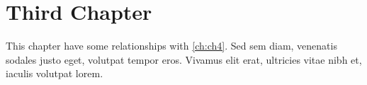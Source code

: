 \par\chapter{Third Chapter}\label{ch:ch3}
\par\noindent This chapter have some relationships with \autoref{ch:ch4}. Sed sem diam, venenatis sodales justo eget, volutpat tempor eros. Vivamus elit erat, ultricies vitae nibh et, iaculis volutpat lorem. 



